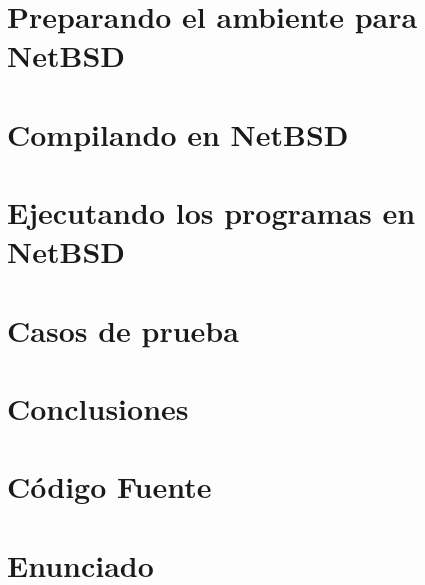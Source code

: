 \documentclass[a4paper,10pt]{article}
\begin{document}
 
\section{Preparando el ambiente para NetBSD}
 
\section{Compilando en NetBSD}

\section{Ejecutando los programas en NetBSD}

\section{Casos de prueba}

\newpage
\section{Conclusiones}

\appendix
\newpage
\section{C\'odigo Fuente}
%    
%    
%    

\newpage
\section{Enunciado}
%
\end{document}

